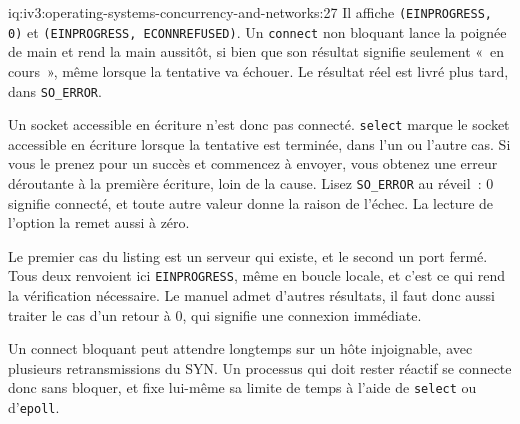 \begin{solution}{iq:iv3:operating-systems-concurrency-and-networks:27}
Il affiche \texttt{(\textquotesingle{}EINPROGRESS\textquotesingle{}, 0)} et \texttt{(\textquotesingle{}EINPROGRESS\textquotesingle{}, \textquotesingle{}ECONNREFUSED\textquotesingle{})}. Un \texttt{connect} non bloquant lance la poignée de main et rend la main aussitôt, si bien que son résultat signifie seulement «~en cours~», même lorsque la tentative va échouer. Le résultat réel est livré plus tard, dans \texttt{SO\_ERROR}.

Un socket accessible en écriture n'est donc pas connecté. \texttt{select} marque le socket accessible en écriture lorsque la tentative est terminée, dans l'un ou l'autre cas. Si vous le prenez pour un succès et commencez à envoyer, vous obtenez une erreur déroutante à la première écriture, loin de la cause. Lisez \texttt{SO\_ERROR} au réveil~: 0 signifie connecté, et toute autre valeur donne la raison de l'échec. La lecture de l'option la remet aussi à zéro.

Le premier cas du listing est un serveur qui existe, et le second un port fermé. Tous deux renvoient ici \texttt{EINPROGRESS}, même en boucle locale, et c'est ce qui rend la vérification nécessaire. Le manuel admet d'autres résultats, il faut donc aussi traiter le cas d'un retour à 0, qui signifie une connexion immédiate.

Un connect bloquant peut attendre longtemps sur un hôte injoignable, avec plusieurs retransmissions du SYN. Un processus qui doit rester réactif se connecte donc sans bloquer, et fixe lui-même sa limite de temps à l'aide de \texttt{select} ou d'\texttt{epoll}.

\end{solution}

